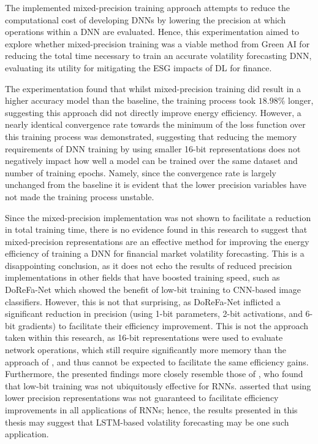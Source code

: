\documentclass[a4paper, 11pt]{report}
\begin{document}
    The implemented mixed-precision training approach attempts to reduce the computational cost of developing DNNs by lowering the precision at which operations within a DNN are evaluated. Hence, this experimentation aimed to explore whether mixed-precision training was a viable method from Green AI for reducing the total time necessary to train an accurate volatility forecasting DNN, evaluating its utility for mitigating the ESG impacts of DL for finance.

    The experimentation found that whilst mixed-precision training did result in a higher accuracy model than the baseline, the training process took $18.98\%$ longer, suggesting this approach did not directly improve energy efficiency. However, a nearly identical convergence rate towards the minimum of the loss function over this training process was demonstrated, suggesting that reducing the memory requirements of DNN training by using smaller 16-bit representations does not negatively impact how well a model can be trained over the same dataset and number of training epochs. Namely, since the convergence rate is largely unchanged from the baseline it is evident that the lower precision variables have not made the training process unstable. 

    Since the mixed-precision implementation was not shown to facilitate a reduction in total training time, there is no evidence found in this research to suggest that mixed-precision representations are an effective method for improving the energy efficiency of training a DNN for financial market volatility forecasting. This is a disappointing conclusion, as it does not echo the results of reduced precision implementations in other fields that have boosted training speed, such as DoReFa-Net \citep{zhou-2016} which showed the benefit of low-bit training to CNN-based image classifiers. However, this is not that surprising, as DoReFa-Net inflicted a significant reduction in precision (using 1-bit parameters, 2-bit activations, and 6-bit gradients) to facilitate their efficiency improvement. This is not the approach taken within this research, as 16-bit representations were used to evaluate network operations, which still require significantly more memory than the approach of \citet{zhou-2016}, and thus cannot be expected to facilitate the same efficiency gains. Furthermore, the presented findings more closely resemble those of \citet{ott-2017}, who found that low-bit training was not ubiquitously effective for RNNs. \citet{ott-2017} asserted that using lower precision representations was not guaranteed to facilitate efficiency improvements in all applications of RNNs; hence, the results presented in this thesis may suggest that LSTM-based volatility forecasting may be one such application.
\end{document}
